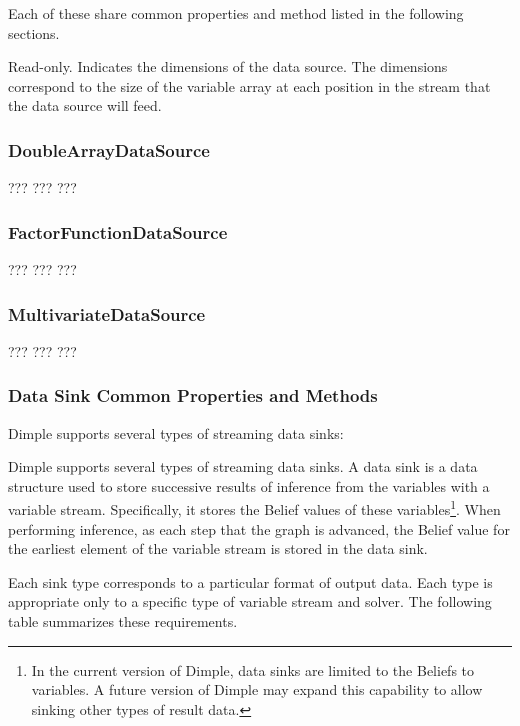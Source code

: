 Each of these share common properties and method listed in the following sections.



Read-only.  Indicates the dimensions of the data source.  The dimensions correspond to the size of the variable array at each position in the stream that the data source will feed.


\subsubsection{DoubleArrayDataSource}
???
???
???

\subsubsection{FactorFunctionDataSource}
???
???
???

\subsubsection{MultivariateDataSource}
???
???
???


\subsubsection{Data Sink Common Properties and Methods}
\label{sec:DataSink}

Dimple supports several types of streaming data sinks:

Dimple supports several types of streaming data sinks.  A data sink is a data structure used to store successive results of inference from the variables with a variable stream.  Specifically, it stores the Belief values of these variables\footnote{In the current version of Dimple, data sinks are limited to the Beliefs to variables.  A future version of Dimple may expand this capability to allow sinking other types of result data.}.  When performing inference, as each step that the graph is advanced, the Belief value for the earliest element of the variable stream is stored in the data sink.

Each sink type corresponds to a particular format of output data.  Each type is appropriate only to a specific type of variable stream and solver.  The following table summarizes these requirements.

